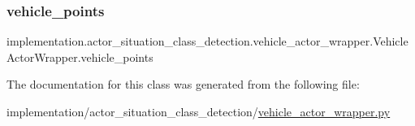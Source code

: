 \subsubsection{\texorpdfstring{vehicle\+\_\+points}{vehicle\_points}}
{\footnotesize\ttfamily implementation.\+actor\+\_\+situation\+\_\+class\+\_\+detection.\+vehicle\+\_\+actor\+\_\+wrapper.\+Vehicle\+Actor\+Wrapper.\+vehicle\+\_\+points}



The documentation for this class was generated from the following file\+:\begin{DoxyCompactItemize}
\item 
implementation/actor\+\_\+situation\+\_\+class\+\_\+detection/\hyperlink{vehicle__actor__wrapper_8py}{vehicle\+\_\+actor\+\_\+wrapper.\+py}\end{DoxyCompactItemize}
